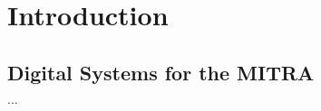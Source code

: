 
\chapter{Introduction} %

\label{Chapter1} %



\section{Digital Systems for the MITRA}
\label{sec:aboutDigiMITRA}
$\ldots$
